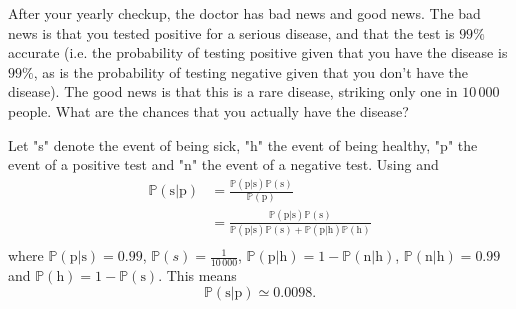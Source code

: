 \begin{example}
	After your yearly checkup, the doctor has bad news and good news. The bad news is that you tested positive for a serious disease, and that the test is $99\%$ accurate (i.e. the probability of testing positive given that you have the disease is $99\%$, as is the probability of testing negative given that you don't have the disease). The good news is that this is a rare disease, striking only one in $10\,000$ people. What are the chances that you actually have the disease?\newline
	
	Let "s" denote the event of being sick, "h" the event of being healthy, "p" the event of a positive test and "n" the event of a negative test. Using  and 
	\begin{equation}
		\begin{split}
			\mathbb{P}(\text{s}|\text{p}) &= \frac{\mathbb{P}(\text{p}|\text{s})\mathbb{P}(\text{s})}{\mathbb{P}(\text{p})}\\
			&= \frac{\mathbb{P}(\text{p}|\text{s})\mathbb{P}(\text{s})}{\mathbb{P}(\text{p}|\text{s})\mathbb{P}(\text{s})+\mathbb{P}(\text{p}|\text{h})\mathbb{P}(\text{h})}\\
		\end{split}
	\end{equation}
	where $\mathbb{P}(\text{p}|\text{s}) = 0.99$, $\mathbb{P}(s) = \frac{1}{10\, 000}$, $\mathbb{P}(\text{p}|\text{h})=1-\mathbb{P}(\text{n}|\text{h})$, $\mathbb{P}(\text{n}|\text{h})=0.99$ and $\mathbb{P}(\text{h})=1-\mathbb{P}(\text{s})$. This means
	\begin{equation}
		\mathbb{P}(\text{s}|\text{p}) \simeq 0.0098.
	\end{equation}		
\end{example}

